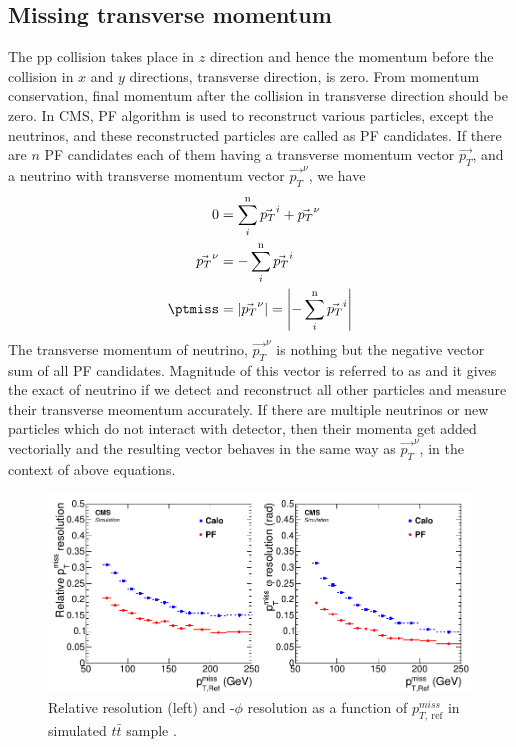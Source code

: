 \subsection{Missing transverse momentum}
The pp collision takes place in $z$ direction and hence the momentum before the collision in $x$ and $y$ directions, transverse direction, is zero. From momentum conservation, final momentum after the collision in transverse direction should be zero. In CMS, PF algorithm is used to reconstruct various particles, except the neutrinos, and these reconstructed particles are called as PF candidates. If there are $n$ PF candidates each of them having a transverse momentum vector $\overrightarrow{p_{T}}$, and a neutrino with transverse momentum vector $\overrightarrow{p_{T}}^{\nu}$, we have
\begin{align}
0 &= \sum_{i}^{\mathrm{n}}\vec{p_{T}}^{i} + \vec{p_{T}}^{\nu} \\
\vec{p_{T}}^{\nu} &= - \sum_{i}^{\mathrm{n}}\vec{p_{T}}^{i}\\
\ptmiss &= |\vec{p_{T}}^{\nu}| = \left|- \sum_{i}^{\mathrm{n}}\vec{p_{T}}^{i}\right|
\end{align}
The transverse momentum of neutrino, $\vec{p_{T}}^{\nu}$ is nothing but the negative vector sum of all PF candidates. Magnitude of this vector is referred to as \ptmiss and it gives the exact \pt of neutrino if we detect and reconstruct all other particles and measure their transverse meomentum accurately. If there are multiple neutrinos or new particles which do not interact with detector, then their momenta get added vectorially and the resulting vector behaves in the same way as $\vec{p_{T}}^{\nu}$, in the context of above equations.
\begin{figure}[h!]
\centering
\includegraphics[width=0.9\linewidth]{../Figures/Chap2/METresoln}
\caption[\ptmiss resolution]{Relative \ptmiss resolution (left) and \ptmiss-$\phi$ resolution as a function of $p_{T,\ \mathrm{ref}}^{miss}$ in simulated $t\bar{t}$ sample \cite{CMS-PRF-14-001}.}
\label{fig:METresoln}
\end{figure}
